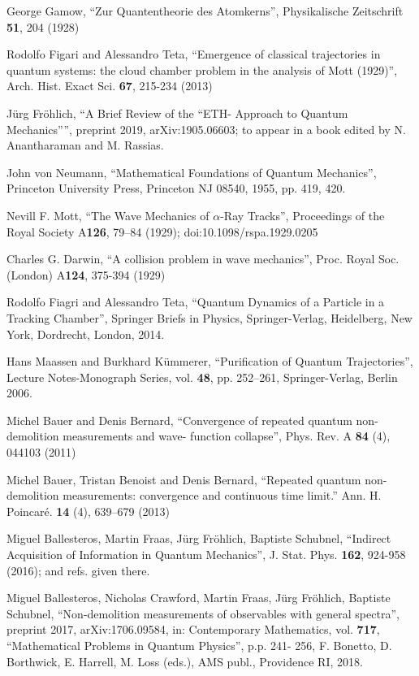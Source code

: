 \documentclass[12pt]{article}
\begin{document}
\begin{thebibliography}{References}

 George Gamow, ``Zur Quantentheorie des Atomkerns'', Physikalische Zeitschrift {\bf{51}}, 204 (1928)

 Rodolfo Figari and Alessandro Teta, ``Emergence of classical trajectories in quantum systems: the cloud chamber problem in the analysis of Mott (1929)'', Arch. Hist. Exact Sci. {\bf{67}}, 215-234 (2013)

 J\"urg Fr\"ohlich, ``A Brief Review of the ``ETH- Approach to Quantum Mechanics'''', preprint 2019,  	arXiv:1905.06603; to appear in a book edited by N. Anantharaman and M. Rassias.

 John von Neumann, ``Mathematical Foundations of Quantum Mechanics'', Princeton University Press, Princeton NJ 08540, 1955, pp. 419, 420.

 Nevill F. Mott, ``The Wave Mechanics of $\alpha$-Ray Tracks'', Proceedings of the Royal Society A{\bf{126}}, 79–84 (1929); doi:10.1098/rspa.1929.0205

 Charles G. Darwin, ``A collision problem in wave mechanics'', Proc. Royal Soc. (London) A{\bf{124}}, 375-394 (1929)

 Rodolfo Fiagri and Alessandro Teta, ``Quantum Dynamics of a Particle in a Tracking Chamber'', Springer Briefs in Physics, Springer-Verlag, Heidelberg, New York, Dordrecht, London, 2014.

 Hans Maassen and Burkhard K\"ummerer, ``Purification of Quantum Trajectories'', Lecture Notes-Monograph Series, vol. {\bf{48}}, pp. 252–261,  Springer-Verlag, Berlin 2006.

 Michel Bauer and Denis Bernard, ``Convergence of repeated quantum non-demolition measurements and wave-
function collapse'',  Phys. Rev. A {\bf{84}} (4), 044103 (2011)

 Michel Bauer, Tristan Benoist and Denis Bernard, ``Repeated quantum non-demolition measurements: convergence and continuous time limit.'' Ann. H. Poincaré. {\bf 14} (4), 639--679 (2013)

 Miguel Ballesteros, Martin Fraas, J\"urg Fr\"ohlich, Baptiste Schubnel, ``Indirect Acquisition of Information in Quantum Mechanics'', J. Stat. Phys. {\bf{162}}, 924-958 (2016); and refs. given there.

 Miguel Ballesteros, Nicholas Crawford, Martin Fraas, J\"urg Fr\"ohlich, Baptiste Schubnel, ``Non-demolition measurements of observables with general spectra'', preprint 2017, arXiv:1706.09584, in: Contemporary Mathematics, vol. {\bf{717}}, ``Mathematical Problems in Quantum Physics'', p.p. 241- 256, F. Bonetto, D. Borthwick, E. Harrell, M. Loss (eds.), AMS publ., Providence RI, 2018.


\end{thebibliography}
\end{document}
